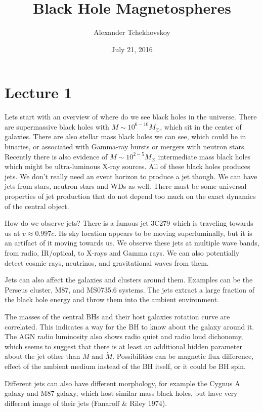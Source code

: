 \documentclass[letterpaper, 11pt]{article}
\numberwithin{equation}{section}
\numberwithin{figure}{section}
\begin{document}
\title{Black Hole Magnetospheres}
\author{Alexander Tchekhovskoy}
\date{July 21, 2016}

\maketitle

\section{Lecture 1}

Lets start with an overview of where do we see black holes in the universe.
There are supermassive black holes with $M\sim 10^{6-10}M_{\odot}$, which sit in
the center of galaxies. There are also stellar mass black holes we can see,
which could be in binaries, or associated with Gamma-ray bursts or mergers with
neutron stars. Recently there is also evidence of $M\sim 10^{2-5}M_{\odot}$
intermediate mass black holes which might be ultra-luminous X-ray sources. All
of these black holes produces jets. We don't really need an event horizon to
produce a jet though. We can have jets from stars, neutron stars and WDs as
well. There must be some universal properties of jet production that do not
depend too much on the exact dynamics of the central object.

How do we observe jets? There is a famous jet 3C279 which is traveling towards
us at $v\approx 0.997c$. Its sky location appears to be moving superluminally,
but it is an artifact of it moving towards us. We observe these jets at multiple
wave bands, from radio, IR/optical, to X-rays and Gamma rays. We can also
potentially detect cosmic rays, neutrinos, and gravitational waves from them.

Jets can also affect the galaxies and clusters around them. Examples can be the
Perseus cluster, M87, and MS0735.6 systems. The jets extract a large fraction of
the black hole energy and throw them into the ambient environment.

The masses of the central BHs and their host galaxies rotation curve are
correlated. This indicates a way for the BH to know about the galaxy around it.
The AGN radio luminosity also shows radio quiet and radio loud dichonomy, which
seems to suggest that there is at least an additional hidden parameter about the
jet other than $M$ and $\dot{M}$. Possibilities can be magnetic flux difference,
effect of the ambient medium instead of the BH itself, or it could be BH spin.

Different jets can also have different morphology, for example the Cygnus A
galaxy and M87 galaxy, which host similar mass black holes, but have very
different image of their jets (Fanaroff \& Riley 1974).
\end{document}
